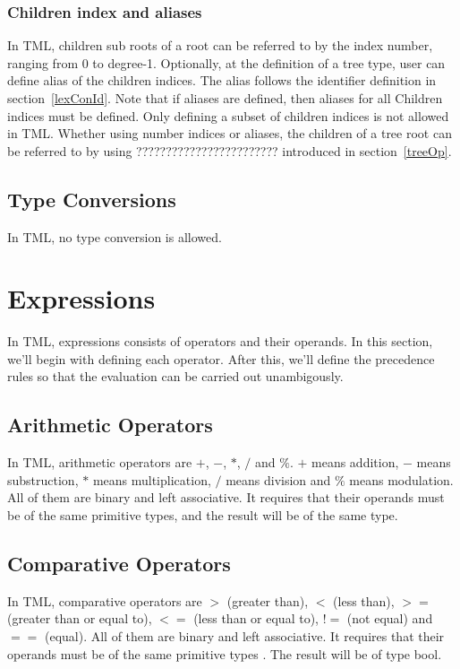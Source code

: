 \documentclass[12pt,psfig,a4]{article}
\begin{document}
\subsubsection {Children index and aliases}
In TML, children sub roots of a root can be referred to by the index number, ranging from 0 to degree-1. Optionally, at the definition of a tree type, user can define alias of the children indices. The alias follows the identifier definition in section~\ref{lexConId}. Note that if aliases are defined, then aliases for all Children indices must be defined. Only defining a subset of children indices is not allowed in TML. Whether using number indices or aliases, the children of a tree root can be referred to by using ???????????????????????? introduced in section~\ref{treeOp}.

\subsection {Type Conversions}
In TML, no type conversion is allowed.


\section{Expressions}
In TML, expressions consists of operators and their operands. In this section, we'll begin with defining each operator. After this, we'll define the precedence rules so that the evaluation can be carried out unambigously.

\subsection{Arithmetic Operators}
In TML, arithmetic operators are $+$, $-$, $*$, $/$ and $\%$. $+$ means addition, $-$ means substruction, $*$ means multiplication, $/$ means division and $\%$ means modulation. All of them are binary and left associative. It requires that their operands must be of the same primitive types, and the result will be of the same type.

\subsection{Comparative Operators}
In TML, comparative operators are $>$ (greater than), $<$ (less than), $>=$ (greater than or equal to), $<=$ (less than or equal to), $!=$ (not equal) and $==$ (equal). All of them are binary and left associative. It requires that their operands must be of the same primitive types . The result will be of type bool.
\end{document}
